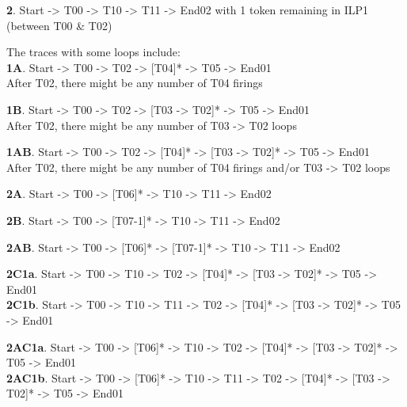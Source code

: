 \documentclass[]{article}
\begin{document}
\textbf{2}. Start -\textgreater{} T00 -\textgreater{} T10
-\textgreater{} T11 -\textgreater{} End02 with 1 token remaining in ILP1
(between T00 \& T02)

The traces with some loops include:\\\textbf{1A}. Start -\textgreater{}
T00 -\textgreater{} T02 -\textgreater{} {[}T04{]}* -\textgreater{} T05
-\textgreater{} End01\\ After T02, there might be any number of T04
firings

\textbf{1B}. Start -\textgreater{} T00 -\textgreater{} T02
-\textgreater{} {[}T03 -\textgreater{} T02{]}* -\textgreater{} T05
-\textgreater{} End01\\ After T02, there might be any number of T03
-\textgreater{} T02 loops

\textbf{1AB}. Start -\textgreater{} T00 -\textgreater{} T02
-\textgreater{} {[}T04{]}* -\textgreater{} {[}T03 -\textgreater{}
T02{]}* -\textgreater{} T05 -\textgreater{} End01\\ After T02, there
might be any number of T04 firings and/or T03 -\textgreater{} T02 loops

\textbf{2A}. Start -\textgreater{} T00 -\textgreater{} {[}T06{]}*
-\textgreater{} T10 -\textgreater{} T11 -\textgreater{} End02

\textbf{2B}. Start -\textgreater{} T00 -\textgreater{} {[}T07-1{]}*
-\textgreater{} T10 -\textgreater{} T11 -\textgreater{} End02

\textbf{2AB}. Start -\textgreater{} T00 -\textgreater{} {[}T06{]}*
-\textgreater{} {[}T07-1{]}* -\textgreater{} T10 -\textgreater{} T11
-\textgreater{} End02

\textbf{2C1a}. Start -\textgreater{} T00 -\textgreater{} T10
-\textgreater{} T02 -\textgreater{} {[}T04{]}* -\textgreater{} {[}T03
-\textgreater{} T02{]}* -\textgreater{} T05 -\textgreater{}
End01\\\textbf{2C1b}. Start -\textgreater{} T00 -\textgreater{} T10
-\textgreater{} T11 -\textgreater{} T02 -\textgreater{} {[}T04{]}*
-\textgreater{} {[}T03 -\textgreater{} T02{]}* -\textgreater{} T05
-\textgreater{} End01

\textbf{2AC1a}. Start -\textgreater{} T00 -\textgreater{} {[}T06{]}*
-\textgreater{} T10 -\textgreater{} T02 -\textgreater{} {[}T04{]}*
-\textgreater{} {[}T03 -\textgreater{} T02{]}* -\textgreater{} T05
-\textgreater{} End01\\\textbf{2AC1b}. Start -\textgreater{} T00
-\textgreater{} {[}T06{]}* -\textgreater{} T10 -\textgreater{} T11
-\textgreater{} T02 -\textgreater{} {[}T04{]}* -\textgreater{} {[}T03
-\textgreater{} T02{]}* -\textgreater{} T05 -\textgreater{} End01
\end{document}
